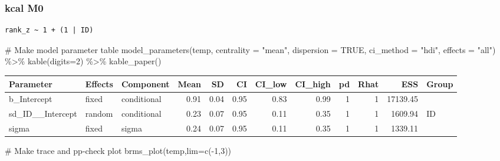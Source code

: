 \documentclass[
  letterpaper,
  DIV=11,
  numbers=noendperiod]{scrartcl}
\newenvironment{Shaded}{\begin{snugshade}}{\end{snugshade}}
\newcommand{\AttributeTok}[1]{\textcolor[rgb]{0.40,0.45,0.13}{#1}}
\newcommand{\CommentTok}[1]{\textcolor[rgb]{0.37,0.37,0.37}{#1}}
\newcommand{\ConstantTok}[1]{\textcolor[rgb]{0.56,0.35,0.01}{#1}}
\newcommand{\DecValTok}[1]{\textcolor[rgb]{0.68,0.00,0.00}{#1}}
\newcommand{\FunctionTok}[1]{\textcolor[rgb]{0.28,0.35,0.67}{#1}}
\newcommand{\NormalTok}[1]{\textcolor[rgb]{0.00,0.23,0.31}{#1}}
\newcommand{\OtherTok}[1]{\textcolor[rgb]{0.00,0.23,0.31}{#1}}
\newcommand{\SpecialCharTok}[1]{\textcolor[rgb]{0.37,0.37,0.37}{#1}}
\newcommand{\StringTok}[1]{\textcolor[rgb]{0.13,0.47,0.30}{#1}}
\begin{document}
\subsubsection{kcal M0}\label{kcal-m0-1}

\begin{Shaded}
\end{Shaded}

\begin{verbatim}
rank_z ~ 1 + (1 | ID) 
\end{verbatim}

\begin{Shaded}
\begin{Highlighting}[]
\CommentTok{\# Make model parameter table}
\FunctionTok{model\_parameters}\NormalTok{(temp, }\AttributeTok{centrality =} \StringTok{"mean"}\NormalTok{, }\AttributeTok{dispersion =} \ConstantTok{TRUE}\NormalTok{, }
                 \AttributeTok{ci\_method =} \StringTok{"hdi"}\NormalTok{, }\AttributeTok{effects =} \StringTok{"all"}\NormalTok{) }\SpecialCharTok{\%\textgreater{}\%} 
  \FunctionTok{kable}\NormalTok{(}\AttributeTok{digits=}\DecValTok{2}\NormalTok{) }\SpecialCharTok{\%\textgreater{}\%} \FunctionTok{kable\_paper}\NormalTok{()}
\end{Highlighting}
\end{Shaded}

\begin{longtable*}[t]{lllrrrrrrrrl}
\toprule
Parameter & Effects & Component & Mean & SD & CI & CI\_low & CI\_high & pd & Rhat & ESS & Group\\
\midrule
b\_Intercept & fixed & conditional & 0.91 & 0.04 & 0.95 & 0.83 & 0.99 & 1 & 1 & 17139.45 & \\
sd\_ID\_\_Intercept & random & conditional & 0.23 & 0.07 & 0.95 & 0.11 & 0.35 & 1 & 1 & 1609.94 & ID\\
sigma & fixed & sigma & 0.24 & 0.07 & 0.95 & 0.11 & 0.35 & 1 & 1 & 1339.11 & \\
\bottomrule
\end{longtable*}

\begin{Shaded}
\begin{Highlighting}[]
\CommentTok{\# Make trace and pp{-}check plot}
\FunctionTok{brms\_plot}\NormalTok{(temp,}\AttributeTok{lim=}\FunctionTok{c}\NormalTok{(}\SpecialCharTok{{-}}\DecValTok{1}\NormalTok{,}\DecValTok{3}\NormalTok{))}
\end{Highlighting}
\end{Shaded}
\end{document}
